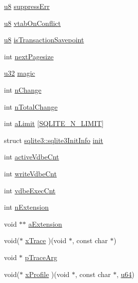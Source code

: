 \begin{DoxyCompactItemize}
\hyperlink{sqlite3_8c_a74a0f6424ae628af25f23f0a35f6ead3}{u8} \hyperlink{structsqlite3_ac6c776a68a0ce0cbacfc3c9fa5129252}{suppress\-Err}
\item 
\hyperlink{sqlite3_8c_a74a0f6424ae628af25f23f0a35f6ead3}{u8} \hyperlink{structsqlite3_acb957d1be62bc33b9f28201cd6dc4d5a}{vtab\-On\-Conflict}
\item 
\hyperlink{sqlite3_8c_a74a0f6424ae628af25f23f0a35f6ead3}{u8} \hyperlink{structsqlite3_acaca2a1d41db7b83a0fe8a477bd22d1d}{is\-Transaction\-Savepoint}
\item 
int \hyperlink{structsqlite3_aceb220475d2e2fc37b8bf896128b1f1e}{next\-Pagesize}
\item 
\hyperlink{sqlite3_8c_a03ad5adfaeb9b7640dde78a0cc390319}{u32} \hyperlink{structsqlite3_ad55cf0f70220c91382bc00b6a9423a0d}{magic}
\item 
int \hyperlink{structsqlite3_aaafd4eaa11ae4ea51d84ed4564a8d372}{n\-Change}
\item 
int \hyperlink{structsqlite3_ade95b396eda5eb5929851abb581cff3f}{n\-Total\-Change}
\item 
int \hyperlink{structsqlite3_ad8acf663e1619905094c9dfe4125157b}{a\-Limit} \mbox{[}\hyperlink{sqlite3_8c_af59a055205f1a6cd6c4e302cfbde7c8c}{S\-Q\-L\-I\-T\-E\-\_\-\-N\-\_\-\-L\-I\-M\-I\-T}\mbox{]}
\item 
struct \hyperlink{structsqlite3_1_1sqlite3_init_info}{sqlite3\-::sqlite3\-Init\-Info} \hyperlink{structsqlite3_a14bb7fbfa6b662021069fcdf6b334d70}{init}
\item 
int \hyperlink{structsqlite3_ada07202e7fd80f275e2e5063d96b5cb0}{active\-Vdbe\-Cnt}
\item 
int \hyperlink{structsqlite3_a632e51f8d35c1e8802639661e2fcd567}{write\-Vdbe\-Cnt}
\item 
int \hyperlink{structsqlite3_a7fe8223a600842ffaf99183b1697a6d6}{vdbe\-Exec\-Cnt}
\item 
int \hyperlink{structsqlite3_aa57fc38ef27d8fa59221cb5c0e54f7fb}{n\-Extension}
\item 
void $\ast$$\ast$ \hyperlink{structsqlite3_aa97954113d8e35c97f8a3af534703f7b}{a\-Extension}
\item 
void($\ast$ \hyperlink{structsqlite3_ae438713860c36ad393eb28702b67fec5}{x\-Trace} )(void $\ast$, const char $\ast$)
\item 
void $\ast$ \hyperlink{structsqlite3_ae0920576e4e92f1b736255fcfad649d1}{p\-Trace\-Arg}
\item 
void($\ast$ \hyperlink{structsqlite3_aa02bf4f3ffdaf52d43a3668661903ffb}{x\-Profile} )(void $\ast$, const char $\ast$, \hyperlink{sqlite3_8c_a0e0cdb443a471891a042a6bfdc4644ca}{u64})
$$
\end{DoxyCompactItemize}
